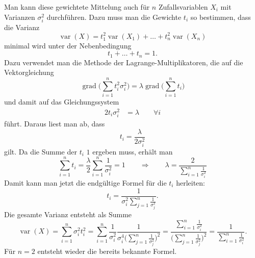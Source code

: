 \begin{diskussion}
Man kann diese gewichtete Mittelung auch für $n$ Zufallsvariablen $X_i$
mit Varianzen $\sigma_i^2$ durchführen.
Dazu muss man die Gewichte $t_i$ so bestimmen, dass die Varianz
\[
\operatorname{var}(X)
=
t_1^2\operatorname{var}(X_1)
+\dots+
t_n^2\operatorname{var}(X_n)
\]
minimal wird unter der Nebenbedingung 
\[
t_1+\dots+t_n=1.
\]
Dazu verwendet man die Methode der Lagrange-Multiplikatoren, die auf
die Vektorgleichung
\[
\operatorname{grad}\biggl(\sum_{i=1}^nt_i^2\sigma_i^2\biggr)
=
\lambda \operatorname{grad}\biggl(\sum_{i=1}^nt_i\biggr)
\]
und damit auf das Gleichungssystem
\begin{align*}
2t_i\sigma_i^2&=\lambda\qquad \forall i
\end{align*}
führt.
Daraus liest man ab, dass 
\[
t_i
=
\frac{\lambda}{2\sigma_i^2}
\]
gilt.
Da die Summe der $t_i$ $1$ ergeben muss, erhält man
\[
\sum_{i=1}^n t_i
=
\frac{\lambda}{2}
\sum_{i=1}^n \frac{1}{\sigma_i^2}
=
1
\qquad\Rightarrow\qquad
\lambda=\frac{2}{\displaystyle\sum_{i=1}^n\frac1{\sigma_i^2}}
\]
Damit kann man jetzt die endgültige Formel für die $t_i$ herleiten:
\[
t_i
=
\frac{1}{\displaystyle\sigma_i^2\sum_{j=1}^n\frac{1}{\sigma_j^2}}.
\]
Die gesamte Varianz entsteht als Summe 
\[
\operatorname{var}(X)
=
\sum_{i=1}^n\sigma_i^2t_i^2
=
\sum_{i=1}^n\frac{1}{\sigma_i^2}
\frac{1}{\displaystyle\sigma_i^4\biggl(\sum_{j=1}^n\frac{1}{\sigma_j^2}\biggr)^2}
=
\frac{\displaystyle\sum_{i=1}^n \frac1{\sigma_i^2}}{
\biggl(\displaystyle\sum_{j=1}^n\frac{1}{\sigma_j^2}\biggr)^2}
=
\frac{1}{\displaystyle\sum_{i=1}^n \frac1{\sigma_i^2}}
.
\]
Für $n=2$ entsteht wieder die bereits bekannte Formel.
\end{diskussion}

